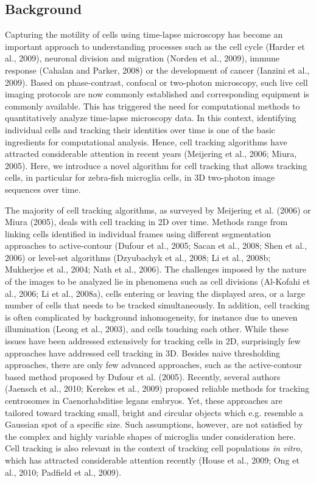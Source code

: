 \subsection{Background}
Capturing the motility of cells using time-lapse microscopy has become an important approach to understanding processes such as the cell cycle (Harder et al., 2009), neuronal division and migration (Norden et al., 2009), immune response (Cahalan and Parker, 2008) or the development of cancer (Ianzini et al., 2009). Based on phase-contrast, confocal or two-photon microscopy, such live cell imaging protocols are now commonly established and corresponding equipment is commonly available. This has triggered the need for computational methods to quantitatively analyze time-lapse microscopy data. In this context, identifying individual cells and tracking their identities over time is one of the basic ingredients for computational analysis. Hence, cell tracking algorithms have attracted considerable attention in recent years (Meijering et al., 2006; Miura, 2005). Here, we introduce a novel algorithm for cell tracking that allows tracking cells, in particular for zebra-fish microglia cells, in 3D two-photon image sequences over time.

The majority of cell tracking algorithms, as surveyed by Meijering et al. (2006) or Miura (2005), deals with cell tracking in 2D over time. Methods range from linking cells identified in individual frames using different segmentation approaches to active-contour (Dufour et al., 2005; Sacan et al., 2008; Shen et al., 2006) or level-set algorithms (Dzyubachyk et al., 2008; Li et al., 2008b; Mukherjee et al., 2004; Nath et al., 2006). The challenges imposed by the nature of the images to be analyzed lie in phenomena such as cell divisions (Al-Kofahi et al., 2006; Li et al., 2008a), cells entering or leaving the displayed area, or a large number of cells that needs to be tracked simultaneously. In addition, cell tracking is often complicated by background inhomogeneity, for instance due to uneven illumination (Leong et al., 2003), and cells touching each other. While these issues have been addressed extensively for tracking cells in 2D, surprisingly few approaches have addressed cell tracking in 3D. Besides naive thresholding approaches, there are only few advanced approaches, such as the active-contour based method proposed by Dufour et al. (2005). Recently, several authors (Jaensch et al., 2010; Kerekes et al., 2009) proposed reliable methods for tracking centrosomes in Caenorhabditise legans embryos. Yet, these approaches are tailored toward tracking small, bright and circular objects which e.g. resemble a Gaussian spot of a specific size. Such assumptions, however, are not satisfied by the complex and highly variable shapes of microglia under consideration here. Cell tracking is also relevant in the context of tracking cell populations \emph{in vitro}, which has attracted considerable attention recently (House et al., 2009; Ong et al., 2010; Padfield et al., 2009).

